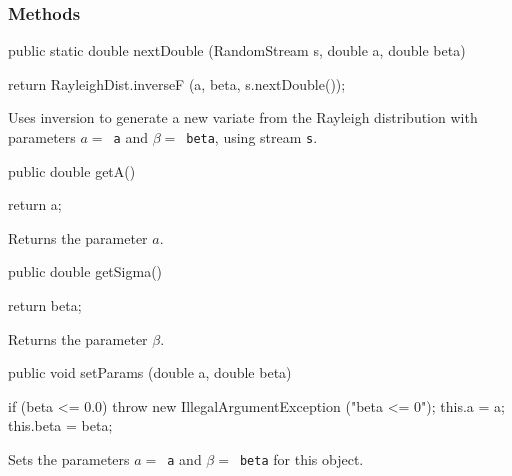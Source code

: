 \subsubsection* {Methods}
\begin{code}

   public static double nextDouble (RandomStream s, double a, double beta) \begin{hide} {
       return RayleighDist.inverseF (a, beta, s.nextDouble());
   }\end{hide}
\end{code}
\begin{tabb}
   Uses inversion to generate a new variate from the Rayleigh
   distribution with parameters $a = $~\texttt{a} and
   $\beta = $~\texttt{beta}, using stream \texttt{s}.
\end{tabb}
\begin{code}

   public double getA()\begin{hide} {
      return a;
   }\end{hide}
\end{code}
\begin{tabb} Returns the parameter $a$.
\end{tabb}
\begin{code}

   public double getSigma()\begin{hide} {
      return beta;
   }\end{hide}
\end{code}
\begin{tabb} Returns the parameter $\beta$.
\end{tabb}
\begin{code}

   public void setParams (double a, double beta) \begin{hide} {
      if (beta <= 0.0)
         throw new IllegalArgumentException ("beta <= 0");
      this.a  = a;
      this.beta = beta;
   }\end{hide}
\end{code}
\begin{tabb} Sets the parameters $a = $~\texttt{a} and $\beta=$~\texttt{beta}
 for this object.
\end{tabb}
\begin{code}\begin{hide}
}
\end{hide}
\end{code}
